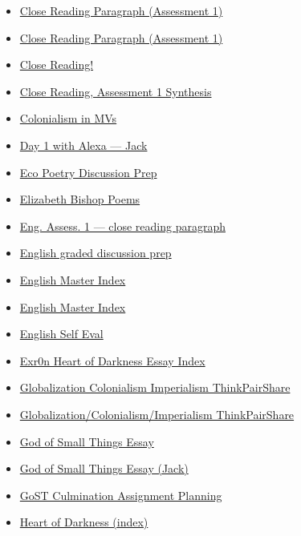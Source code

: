 \documentclass[11pt]{article}
\begin{document}
\begin{itemize}
\begin{itemize}
\begin{itemize}
\item \href{english/english10/KBe20eng201retA1index.org}{Close Reading Paragraph (Assessment 1)}
\item \href{english/english10/exr0n20eng201retA1Index.org}{Close Reading Paragraph (Assessment 1)}
\item \href{english/english10/KBhENG201CloseReading.org}{Close Reading!}
\item \href{english/english10/KBhENG201CloseReadingAss1.org}{Close Reading, Assessment 1 Synthesis}
\item \href{english/english10/KBhENG201ColonialismInMVs.org}{Colonialism in MVs}
\item \href{english/english10/KBhENG201AlexaD1.org}{Day 1 with Alexa --- Jack}
\item \href{english/english10/KBxEcoPoetryDiscussionPrep.org}{Eco Poetry Discussion Prep}
\item \href{english/english10/KBElizabethBishop.org}{Elizabeth Bishop Poems}
\item \href{english/english10/KBhENG201CloseReadingParagraph.org}{Eng. Assess. 1 --- close reading paragraph}
\item \href{english/english10/KBENG201GradedDiscussionPrep.org}{English graded discussion prep}
\item \href{english/english10/index.org}{English Master Index}
\item \href{english/english10/KBEnglishMasterIndex.org}{English Master Index}
\item \href{english/english10/KBxEngSelfEval.org}{English Self Eval}
\item \href{english/english10/KBe20eng201retHeartOfDarknessEssay.org}{Exr0n Heart of Darkness Essay Index}
\item \href{english/english10/KB20200824144641.org}{Globalization Colonialism Imperialism ThinkPairShare}
\item \href{english/english10/KBe-2020eng201floD1Breakout.org}{Globalization/Colonialism/Imperialism ThinkPairShare}
\item \href{english/english10/KBe21eng201retGoSTEssay.org}{God of Small Things Essay}
\item \href{english/english10/KBhENG201GoSTEssayPlanningJack.org}{God of Small Things Essay (Jack)}
\item \href{english/english10/KBxGoSTCulminationPlanning.org}{GoST Culmination Assignment Planning}
\item \href{english/english10/KBhENG201HeartOfHardness.org}{Heart of Darkness (index)}

\end{itemize}
\end{itemize}
\end{itemize}
\end{document}
